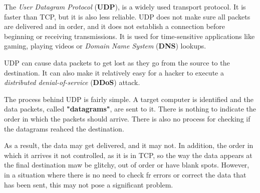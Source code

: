 The \textit{User Datagram Protocol} (\textbf{UDP}), is a widely used transport protocol. It is faster than TCP, but it is also less reliable. UDP does not make sure all packets are delivered and in order, and it does not establish a connection before beginning or receiving transmissions. It is used for time-sensitive applications like gaming, playing videos or \textit{Domain Name System} (\textbf{DNS}) lookups.

UDP can cause data packets to get lost as they go from the source to the destination. It can also make it relatively easy for a hacker to execute a \textit{distributed denial-of-service} (\textbf{DDoS}) attack.

The process behind UDP is fairly simple. A target computer is identified and the data packets, called \textbf{"datagrams"}, are sent to it. There is nothing to indicate the order in which the packets should arrive. There is also no process for checking if the datagrams reahced the destination.

As a result, the data may get delivered, and it may not. In addition, the order in which it arrives it not controlled, as it is in TCP, so the way the data appears at the final destination maw be glitchy, out of order or have blank spots. However, in a situation where there is no need to check fr errors or correct the data that has been sent, this may not pose a significant problem.

